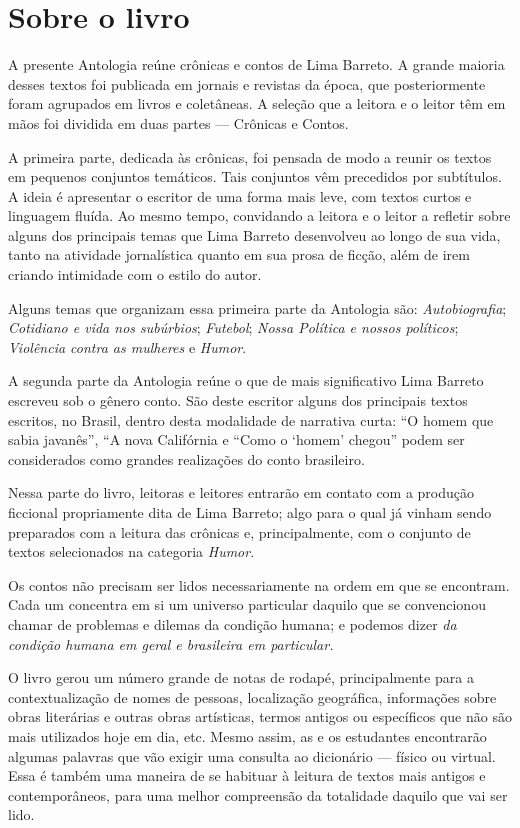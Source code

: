 \section{Sobre o livro}

A presente Antologia reúne crônicas e contos de Lima Barreto. A grande
maioria desses textos foi publicada em jornais e revistas da época, que
posteriormente foram agrupados em livros e coletâneas. A seleção que a
leitora e o leitor têm em mãos foi dividida em duas partes --- Crônicas e
Contos.

A primeira parte, dedicada às crônicas, foi pensada de modo a reunir os
textos em pequenos conjuntos temáticos. Tais conjuntos vêm precedidos
por subtítulos. A ideia é apresentar o escritor de uma forma mais leve,
com textos curtos e linguagem fluída. Ao mesmo tempo, convidando a
leitora e o leitor a refletir sobre alguns dos principais temas que Lima
Barreto desenvolveu ao longo de sua vida, tanto na atividade
jornalística quanto em sua prosa de ficção, além de irem criando
intimidade com o estilo do autor.

Alguns temas que organizam essa primeira parte da Antologia são:
\textit{Autobiografia}; \textit{Cotidiano e vida nos subúrbios};
\textit{Futebol}; \textit{Nossa Política e nossos políticos};
\textit{Violência contra as mulheres} e \textit{Humor}.

A segunda parte da Antologia reúne o que de mais significativo Lima
Barreto escreveu sob o gênero conto. São deste escritor alguns dos
principais textos escritos, no Brasil, dentro desta modalidade de
narrativa curta: ``O homem que sabia javanês'', ``A nova Califórnia e
``Como o `homem' chegou'' podem ser considerados como grandes
realizações do conto brasileiro.

Nessa parte do livro, leitoras e leitores entrarão em contato com a
produção ficcional propriamente dita de Lima Barreto; algo para o qual
já vinham sendo preparados com a leitura das crônicas e, principalmente,
com o conjunto de textos selecionados na categoria \emph{Humor}.

Os contos não precisam ser lidos necessariamente na ordem em que se
encontram. Cada um concentra em si um universo particular daquilo que se
convencionou chamar de problemas e dilemas da condição humana; e podemos
dizer \emph{da condição humana em geral e brasileira em particular.}

O livro gerou um número grande de notas de rodapé, principalmente para a
contextualização de nomes de pessoas, localização geográfica,
informações sobre obras literárias e outras obras artísticas, termos
antigos ou específicos que não são mais utilizados hoje em dia, etc.
Mesmo assim, as e os estudantes encontrarão algumas palavras que vão
exigir uma consulta ao dicionário --- físico ou virtual. Essa é também
uma maneira de se habituar à leitura de textos mais antigos e
contemporâneos, para uma melhor compreensão da totalidade daquilo que
vai ser lido.

